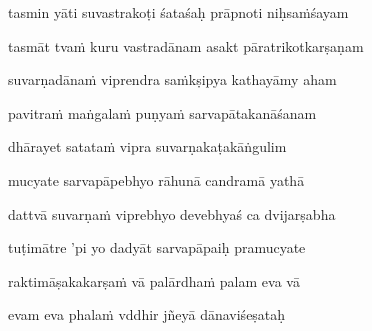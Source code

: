 \nemslokac 
tasmin yāti suvastrakoṭi śataśaḥ prāpnoti niḥsaṁśayam
\dontdisplaylinenum

\nemslokad 
tasmāt tvaṁ kuru vastradānam asakt pāratrikotkarṣaṇam \veg\dontdisplaylinenum



\vers
{}

suvarṇadānaṁ viprendra saṁkṣipya kathayāmy aham\thinspace{\dandab} \dontdisplaylinenum

pavitraṁ maṅgalaṁ puṇyaṁ sarvapātakanāśanam \veg\dontdisplaylinenum
{}

dhārayet satataṁ vipra suvarṇakaṭakāṅgulim\thinspace{\dandab} \dontdisplaylinenum

mucyate sarvapāpebhyo rāhunā candramā yathā \veg\dontdisplaylinenum

dattvā suvarṇaṁ viprebhyo devebhyaś ca dvijarṣabha\thinspace{\dandab} \dontdisplaylinenum

tuṭimātre 'pi yo dadyāt sarvapāpaiḥ pramucyate \veg\dontdisplaylinenum
{}

raktimāṣakakarṣaṁ vā palārdhaṁ palam eva vā\thinspace{\dandab} \dontdisplaylinenum

evam eva phalaṁ vddhir jñeyā dānaviśeṣataḥ \veg\dontdisplaylinenum


